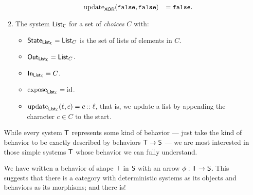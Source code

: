 \documentclass[DynamicalBook]{subfiles}
\begin{document}
\begin{exercise}
\begin{enumerate}
\begin{itemize}
\[\begin{aligned}
        &\mathrm{update}_{\mathsf{XOR}}(\mathtt{false}, \mathtt{false}) &= \mathtt{false}.
          \end{aligned}\]
    \end{itemize}
  \item The system $\mathsf{List_C}$ for a set of \emph{choices} $C$ with:
    \begin{itemize}
      \item $\mathsf{State}_{\mathsf{List_C}} = \mathsf{List}_C$ is the set of lists of elements in
        $C$.
      \item $\mathsf{Out}_{\mathsf{List_C}} = \mathsf{List}_C$.
      \item $\mathsf{In}_{\mathsf{List_C}} = C$.
      \item $\mathrm{expose}_{\mathsf{List_C}} = \mathrm{id}$.
      \item $\mathrm{update}_{\mathsf{List_C}}(\ell, c) = c::\ell$, that is, we update a list by
        appending the character $c \in C$ to the start.
    \end{itemize}
  \end{enumerate}
\end{exercise}

While every system $\mathsf{T}$ represents some kind of behavior --- just take the kind of
behavior to be exactly described by behaviors $\mathsf{T} \to \mathsf{S}$ --- we are
most interested in those simple systems $\mathsf{T}$ whose behavior we can fully
understand. 


We have written a behavior of shape $\mathsf{T}$ in $\mathsf{S}$ with an arrow $\phi :
\mathsf{T} \to \mathsf{S}$. This suggests that there is a category with deterministic
systems as its objects and behaviors as its morphisms; and there is!
\end{document}
